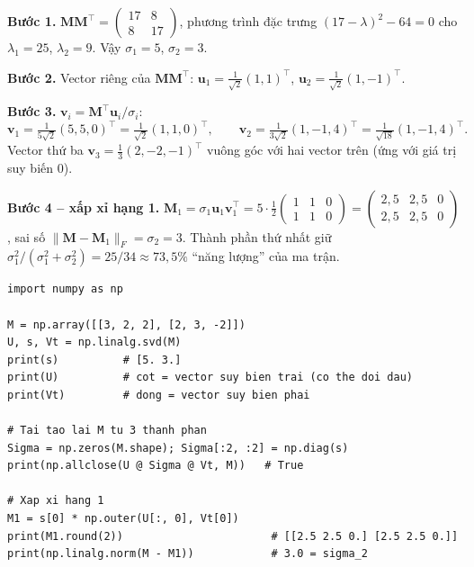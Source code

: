 \noindent\textbf{Bước 1.} $\mathbf{M}\mathbf{M}^{\top} = \begin{pmatrix} 17 & 8 \\ 8 & 17 \end{pmatrix}$, phương trình đặc trưng $(17 - \lambda)^2 - 64 = 0$ cho $\lambda_1 = 25$, $\lambda_2 = 9$. Vậy $\sigma_1 = 5$, $\sigma_2 = 3$.

\noindent\textbf{Bước 2.} Vector riêng của $\mathbf{M}\mathbf{M}^{\top}$: $\mathbf{u}_1 = \tfrac{1}{\sqrt{2}}(1, 1)^{\top}$, $\mathbf{u}_2 = \tfrac{1}{\sqrt{2}}(1, -1)^{\top}$.

\noindent\textbf{Bước 3.} $\mathbf{v}_i = \mathbf{M}^{\top}\mathbf{u}_i / \sigma_i$:
\[
    \mathbf{v}_1 = \tfrac{1}{5\sqrt{2}}(5, 5, 0)^{\top} = \tfrac{1}{\sqrt{2}}(1, 1, 0)^{\top}, \qquad
    \mathbf{v}_2 = \tfrac{1}{3\sqrt{2}}(1, -1, 4)^{\top} = \tfrac{1}{\sqrt{18}}(1, -1, 4)^{\top}.
\]
Vector thứ ba $\mathbf{v}_3 = \tfrac{1}{3}(2, -2, -1)^{\top}$ vuông góc với hai vector trên (ứng với giá trị suy biến 0).

\noindent\textbf{Bước 4 -- xấp xỉ hạng 1.} $\mathbf{M}_1 = \sigma_1 \mathbf{u}_1 \mathbf{v}_1^{\top} = 5 \cdot \tfrac{1}{2}\begin{pmatrix} 1 & 1 & 0 \\ 1 & 1 & 0 \end{pmatrix} = \begin{pmatrix} 2{,}5 & 2{,}5 & 0 \\ 2{,}5 & 2{,}5 & 0 \end{pmatrix}$, sai số $\|\mathbf{M} - \mathbf{M}_1\|_F = \sigma_2 = 3$. Thành phần thứ nhất giữ $\sigma_1^2 / (\sigma_1^2 + \sigma_2^2) = 25/34 \approx 73{,}5\%$ ``năng lượng'' của ma trận.

\begin{lstlisting}[caption={SVD với NumPy (ví dụ trên lớp)}]
import numpy as np

M = np.array([[3, 2, 2], [2, 3, -2]])
U, s, Vt = np.linalg.svd(M)
print(s)          # [5. 3.]
print(U)          # cot = vector suy bien trai (co the doi dau)
print(Vt)         # dong = vector suy bien phai

# Tai tao lai M tu 3 thanh phan
Sigma = np.zeros(M.shape); Sigma[:2, :2] = np.diag(s)
print(np.allclose(U @ Sigma @ Vt, M))   # True

# Xap xi hang 1
M1 = s[0] * np.outer(U[:, 0], Vt[0])
print(M1.round(2))                       # [[2.5 2.5 0.] [2.5 2.5 0.]]
print(np.linalg.norm(M - M1))            # 3.0 = sigma_2
\end{lstlisting}

